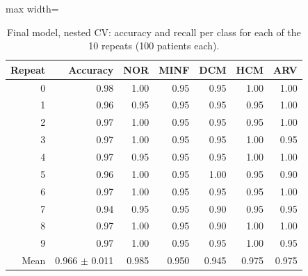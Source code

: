 \begin{table}[H]
\centering
\small
\setlength{\tabcolsep}{4pt}
\begin{adjustbox}{max width=\linewidth}
\begin{tabular}{rrrrrrr}
\toprule
Repeat & Accuracy & NOR & MINF & DCM & HCM & ARV \\
\midrule
0 & 0.98 & 1.00 & 0.95 & 0.95 & 1.00 & 1.00 \\
1 & 0.96 & 0.95 & 0.95 & 0.95 & 0.95 & 1.00 \\
2 & 0.97 & 1.00 & 0.95 & 0.95 & 0.95 & 1.00 \\
3 & 0.97 & 1.00 & 0.95 & 0.95 & 1.00 & 0.95 \\
4 & 0.97 & 0.95 & 0.95 & 0.95 & 1.00 & 1.00 \\
5 & 0.96 & 1.00 & 0.95 & 1.00 & 0.95 & 0.90 \\
6 & 0.97 & 1.00 & 0.95 & 0.95 & 0.95 & 1.00 \\
7 & 0.94 & 0.95 & 0.95 & 0.90 & 0.95 & 0.95 \\
8 & 0.97 & 1.00 & 0.95 & 0.90 & 1.00 & 1.00 \\
9 & 0.97 & 1.00 & 0.95 & 0.95 & 1.00 & 0.95 \\
\midrule
Mean & 0.966 $\pm$ 0.011 & 0.985 & 0.950 & 0.945 & 0.975 & 0.975 \\
\bottomrule
\end{tabular}
\end{adjustbox}
\caption{Final model, nested CV: accuracy and recall per class for each of the 10 repeats (100 patients each).}
\label{tab:supp-repeats}
\end{table}
